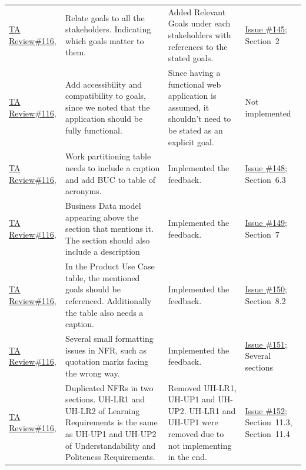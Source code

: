 \documentclass{article}
\begin{document}
\begin{longtable}{p{} p{}
                    p{} p{}}
    \href{https://github.com/thaafei/DomainX/issues/116}{TA Review\#116},
    &
    Relate goals to all the stakeholders. Indicating which goals matter to them.
    &
    Added Relevant Goals under each stakeholders with references to the stated goals.
    &
    \href{https://github.com/thaafei/DomainX/issues/145}{Issue \#145}; Section~2
    \\

    \href{https://github.com/thaafei/DomainX/issues/116}{TA Review\#116},
    &
    Add accessibility and compatibility to goals, since we noted that the application should be fully functional.
    &
    Since having a functional web application is assumed, it shouldn't need to be stated as an explicit goal.
    &
    Not implemented \\

    \href{https://github.com/thaafei/DomainX/issues/116}{TA Review\#116},
    &
    Work partitioning table needs to include a caption and add BUC to table of acronyms.
    &
    Implemented the feedback.
    &
    \href{https://github.com/thaafei/DomainX/issues/148}{Issue \#148}; Section~6.3 \\

    \href{https://github.com/thaafei/DomainX/issues/116}{TA Review\#116},
    &
    Business Data model appearing above the section that mentions it. The section should also include a description
    &
    Implemented the feedback.
    &
    \href{https://github.com/thaafei/DomainX/issues/149}{Issue \#149}; Section~7 \\

    \href{https://github.com/thaafei/DomainX/issues/116}{TA Review\#116},
    &
    In the Product Use Case table, the mentioned goals should be referenced. Additionally the table also needs a caption.&
    Implemented the feedback.
    &
    \href{https://github.com/thaafei/DomainX/issues/150}{Issue \#150}; Section~8.2 \\

    \href{https://github.com/thaafei/DomainX/issues/116}{TA Review\#116},
    &
    Several small formatting issues in NFR, such as quotation marks facing the wrong way.
    &
    Implemented the feedback.
    &
    \href{https://github.com/thaafei/DomainX/issues/151}{Issue \#151}; Several sections \\

    \href{https://github.com/thaafei/DomainX/issues/116}{TA Review\#116},
    &
    Duplicated NFRs in two sections. UH-LR1 and UH-LR2 of Learning Requirements is the same as UH-UP1 and UH-UP2 of Understandability and Politeness Requirements.
    &
    Removed UH-LR1, UH-UP1 and UH-UP2. UH-LR1 and UH-UP1 were removed due to not implementing in the end.
    &
    \href{https://github.com/thaafei/DomainX/issues/152}{Issue \#152}; Section~11.3, Section~11.4 \\


\end{longtable}
\end{document}
